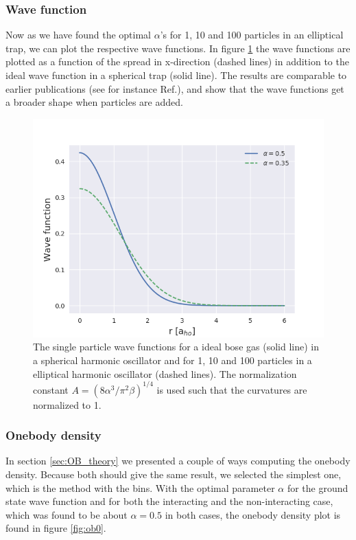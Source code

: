 \documentclass[norsk,a4paper,12pt]{article}
\begin{document}
\subsubsection{Wave function} \label{sec:wf}
Now as we have found the optimal $\alpha$'s for 1, 10 and 100 particles in an elliptical trap, we can plot the respective wave functions. In figure \ref{fig:wf} the wave functions are plotted as a function of the spread in x-direction (dashed lines) in addition to the ideal wave function in a spherical trap (solid line). The results are comparable to earlier publications (see for instance Ref.\cite{Dalfovo}), and show that the wave functions get a broader shape when particles are added.
\begin{figure} [H]
    \centering
    \includegraphics[scale=0.80]{images/wavefunctions.png}
    \caption{The single particle wave functions for a ideal bose gas (solid line) in a spherical harmonic oscillator and for 1, 10 and 100 particles in a elliptical harmonic oscillator (dashed lines). The normalization constant $A=(8\alpha^3/\pi^2\beta)^{1/4}$ is used such that the curvatures are normalized to 1.}
    \label{fig:wf}
\end{figure}
\fi

\subsubsection{Onebody density}
In section \ref{sec:OB_theory} we presented a couple of ways computing the onebody density. Because both should give the same result, we selected the simplest one, which is the method with the bins. With the optimal parameter $\alpha$ for the ground state wave function and for both the interacting and the non-interacting case, which was found to be about $\alpha=0.5$ in both cases, the onebody density plot is found in figure \ref{fig:ob0}.
\end{document}
